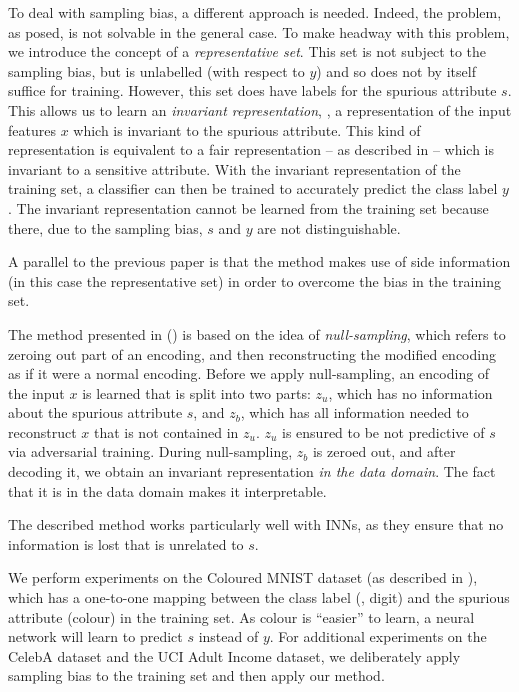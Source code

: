 To deal with sampling bias, a different approach is needed.
Indeed, the problem, as posed, is not solvable in the general case.
To make headway with this problem, we introduce the concept of a \emph{representative set}.
This set is not subject to the sampling bias,
but is unlabelled (with respect to $y$) and so does not by itself suffice for training.
However, this set does have labels for the spurious attribute \(s\).
This allows us to learn an \emph{invariant representation},
\ie, a representation of the input features \(x\) which is invariant to the spurious attribute.
This kind of representation is equivalent to a fair representation -- as described in  --
which is invariant to a sensitive attribute.
With the invariant representation of the training set,
a classifier can then be trained to accurately predict the class label \(y\).
The invariant representation cannot be learned from the training set
because there, due to the sampling bias, \(s\) and \(y\) are not distinguishable.

A parallel to the previous paper is that the method makes use of side information
(in this case the representative set)
in order to overcome the bias in the training set.

The method presented in \citet{kehrenberg2020nullsampling} () is based on the idea of \emph{null-sampling},
which refers to zeroing out part of an encoding,
and then reconstructing the modified encoding as if it were a normal encoding.
Before we apply null-sampling, an encoding of the input \(x\) is learned that is split into two parts:
\(z_u\), which has no information about the spurious attribute \(s\),
and \(z_b\), which has all information needed to reconstruct \(x\) that is not contained in \(z_u\).
\(z_u\) is ensured to be not predictive of \(s\) via adversarial training.
During null-sampling, \(z_b\) is zeroed out, and after decoding it,
we obtain an invariant representation \emph{in the data domain}.
The fact that it is in the data domain makes it interpretable.

The described method works particularly well with \acp{INN},
as they ensure that no information is lost that is unrelated to \(s\).

We perform experiments on the Coloured MNIST dataset (as described in ),
which has a one-to-one mapping between the class label (\ie, digit) and the spurious attribute (colour)
in the training set.
As colour is ``easier'' to learn, a neural network will learn to predict \(s\) instead of \(y\).
For additional experiments on the CelebA dataset and the UCI Adult Income dataset,
we deliberately apply sampling bias to the training set and then apply our method.


